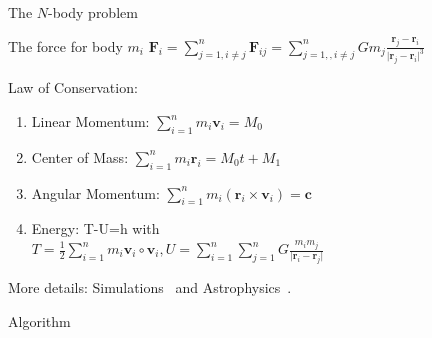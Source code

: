 \documentclass[\classoption]{beamer}
\begin{document}
\begin{frame}{The $N$-body problem}

\begin{block}{The force for body $m_i$}
$\mathbf{F}_i = \sum\limits_{j=1,i\neq j}^n \mathbf{F}_{ij} = \sum\limits_{j=1,,i\neq j}^n G  m_j \frac{\mathbf{r}_j - \mathbf{r}_i}{\vert \mathbf{r}_j - \mathbf{r}_i\vert^3} $
\end{block}

\begin{block}{Law of Conservation:}
\begin{enumerate}
\item Linear Momentum: $\sum\limits_{i=1}^n m_i \mathbf{v}_i = M_0$
\item Center of Mass: $\sum\limits_{i=1}^n m_i \mathbf{r}_i = M_0 t + M_1$
\item Angular Momentum: $\sum\limits_{i=1}^n m_i (\mathbf{r}_i \times \mathbf{v}_i) = \mathbf{c}$
\item Energy: T-U=h with \\
$ T = \frac{1}{2} \sum\limits_{i=1}^n m_i \mathbf{v}_i \circ \mathbf{v}_i  , U= \sum\limits_{i=1}^n \sum\limits_{j=1}^n G \frac{m_i m_j}{\vert\mathbf{r}_i - \mathbf{r}_j\vert} $
\end{enumerate}
\end{block}
More details: Simulations~\cite{aarseth2003gravitational} and Astrophysics~\cite{aarseth2008cambridge}.
\end{frame}

\begin{frame}{Algorithm}

\begin{figure}
\end{figure}

\end{frame}
\end{document}
